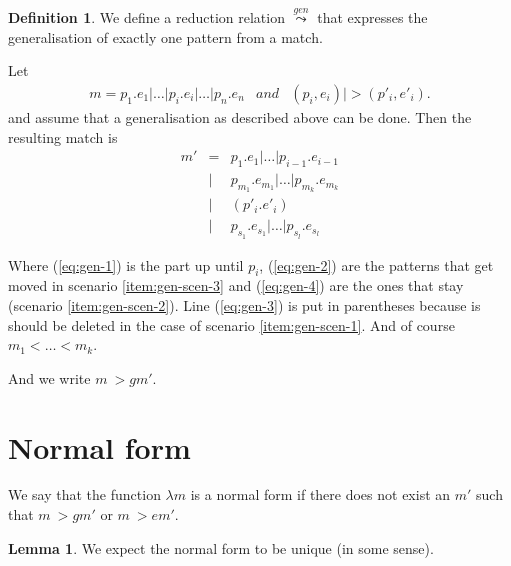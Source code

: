 \documentclass[a4paper, oneside, draft]{memoir}
\theoremstyle{definition}
\newtheorem{definition}{Definition}
\newtheorem{lemma}{Lemma}
\begin{document}
\begin{definition}
  We define a reduction relation $\stackrel{gen}{\leadsto}$ that expresses the
  generalisation of exactly one pattern from a match.

  Let
  \begin{eqnarray*}[rqTcql]
    m = p_1 \texttt{.} e_1 \texttt{|} \ldots \texttt{|} p_i \texttt{.} e_i
    \texttt{|} \ldots \texttt{|} p_n \texttt{.} e_n & and & (p_i, e_i) |> (p'_i,
    e'_i).
  \end{eqnarray*}
  and assume that a generalisation as described above can be done. Then the
  resulting match is
  \begin{eqnarray}
    m' &=& p_1 \texttt{.} e_1 \texttt{|} \ldots \texttt{|} p_{i-1} \texttt{.}
    e_{i-1} \label{eq:gen-1}\\
    &\texttt{|}& p_{m_1} \texttt{.} e_{m_1} \texttt{|} \ldots \texttt{|} p_{m_k}
    \texttt{.} e_{m_k} \label{eq:gen-2}\\
    &\texttt{|}& (p'_i \texttt{.} e'_i) \label{eq:gen-3}\\
    &\texttt{|}& p_{s_1} \texttt{.} e_{s_1} \texttt{|} \ldots \texttt{|} p_{s_l}
    \texttt{.} e_{s_l} \label{eq:gen-4}
  \end{eqnarray}

  Where (\ref{eq:gen-1}) is the part up until $p_i$, (\ref{eq:gen-2}) are the
  patterns that get moved in scenario \ref{item:gen-scen-3} and (\ref{eq:gen-4})
  are the ones that stay (scenario \ref{item:gen-scen-2}). Line (\ref{eq:gen-3})
  is put in parentheses because is should be deleted in the case of scenario
  \ref{item:gen-scen-1}. And of course $m_1 < \ldots < m_k$.

  And we write $m ~>g m'$.
  
\end{definition}

\section{Normal form}
We say that the function $\lambda m$ is a normal form if there does not exist an
$m'$ such that $m ~>g m'$ or $m ~>e m'$.

\begin{lemma}
  We expect the normal form to be unique (in some sense).
\end{lemma}

\end{document}
